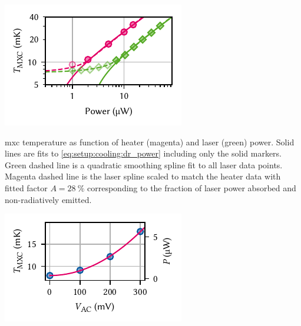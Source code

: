\begin{marginfigure}
    \centering
    \includegraphics{img/pdf/setup/laser_heating}
    \caption[]{
        \Acrlong{mxc} temperature as function of heater (magenta) and laser (green) power.
        Solid lines are fits to \cref{eq:setup:cooling:dr_power} including only the solid markers.
        Green dashed line is a quadratic smoothing spline fit to all laser data points.
        Magenta dashed line is the laser spline scaled to match the heater data with fitted factor $A=\qty{28}{\percent}$ corresponding to the fraction of laser power absorbed and non-radiatively emitted.
    }
    \label{fig:setup:cooling:laser}
\end{marginfigure}

\begin{marginfigure}
    \centering
    \includegraphics{img/pdf/setup/anc_readout_heating}
    \caption[]{
        \Acrlong{mxc} temperature as function of nanopositioner AC readout voltage.
        Solid line is a fit to $T_{\mr{\acrshort{mxc}}} = a V_{\mr{AC}}^2 + b$.
        The secondary axis indicates the conversion from $T_{\mr{\acrshort{mxc}}}$ to power obtained in \cref{fig:setup:cooling:laser} which is approximately linear in this regime, leading to the expected $P\sim R\inverse V_{\mr{AC}}^2$ behavior.
        Fitting $P$ instead of $T_{\mr{\acrshort{mxc}}}$ results in $R=\qty{17.5}{\kilo\ohm}$.
    }
    \label{fig:setup:cooling:anc}
\end{marginfigure}


